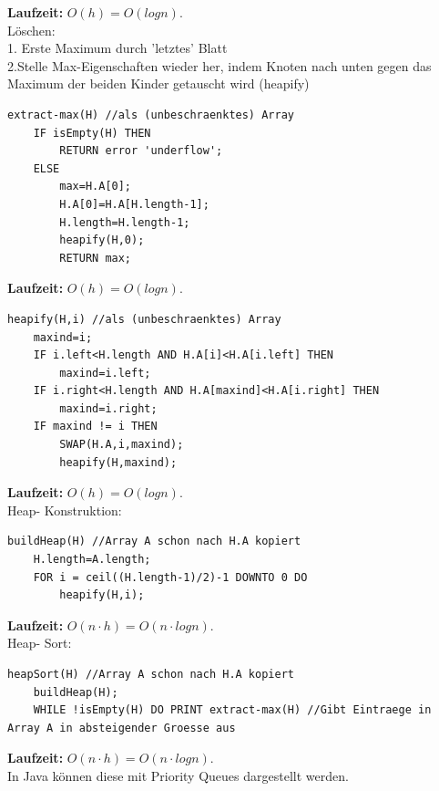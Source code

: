 \documentclass{article}
\begin{document}
            \textbf{Laufzeit:} $O(h) = O(log n)$. \\
            Löschen:\\
            1. Erste Maximum durch 'letztes' Blatt\\
            2.Stelle Max-Eigenschaften wieder her, indem Knoten nach unten gegen das Maximum der beiden Kinder getauscht wird (heapify)\\
            \begin{lstlisting}[style=pseudocode]
extract-max(H) //als (unbeschraenktes) Array
    IF isEmpty(H) THEN
        RETURN error 'underflow';
    ELSE
        max=H.A[0];
        H.A[0]=H.A[H.length-1];
        H.length=H.length-1;
        heapify(H,0);
        RETURN max;
            \end{lstlisting}
            \textbf{Laufzeit:} $O(h) = O(log n)$.
            \begin{lstlisting}[style=pseudocode]
heapify(H,i) //als (unbeschraenktes) Array
    maxind=i;
    IF i.left<H.length AND H.A[i]<H.A[i.left] THEN
        maxind=i.left;
    IF i.right<H.length AND H.A[maxind]<H.A[i.right] THEN
        maxind=i.right;
    IF maxind != i THEN
        SWAP(H.A,i,maxind);
        heapify(H,maxind);
            \end{lstlisting}
            \textbf{Laufzeit:} $O(h) = O(log n)$. \\
            Heap- Konstruktion: \\
            \begin{lstlisting}[style=pseudocode]
buildHeap(H) //Array A schon nach H.A kopiert
    H.length=A.length;
    FOR i = ceil((H.length-1)/2)-1 DOWNTO 0 DO
        heapify(H,i);
            \end{lstlisting}
            \textbf{Laufzeit:} $O(n\cdot h) = O(n\cdot log n)$.\\
            Heap- Sort:\\
            \begin{lstlisting}[style=pseudocode]
heapSort(H) //Array A schon nach H.A kopiert
    buildHeap(H);
    WHILE !isEmpty(H) DO PRINT extract-max(H) //Gibt Eintraege in Array A in absteigender Groesse aus
            \end{lstlisting}
            \textbf{Laufzeit:} $O(n\cdot h) = O(n\cdot log n)$.\\
            In Java können diese mit Priority Queues dargestellt werden.
\end{document}
